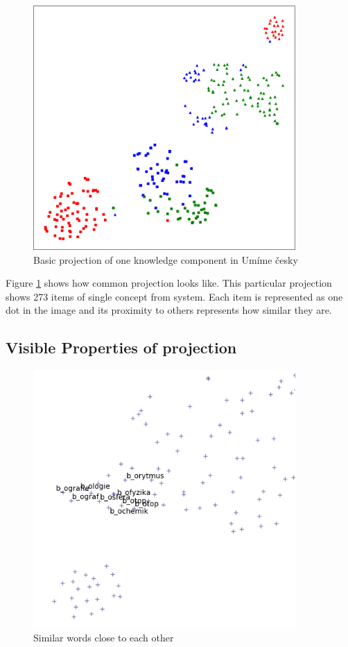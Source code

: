 \documentclass[
  digital, %
  table,   %
  nolof,     %
  nolot,     %
  nocover
]{fithesis3}
\begin{document}
\begin{figure}
  \begin{center}
    \includegraphics[width=10cm]{img/common_projection}
  \end{center}
  \caption{Basic projection of one knowledge component in Umíme česky}
  \label{fig:commonprojection}
\end{figure}

Figure \ref{fig:commonprojection} shows how common projection looks
like. This particular projection shows 273 items of single concept from
system. Each item is represented as one dot in the image and its
proximity to others represents how similar they are.

\subsection{Visible Properties of
projection}\label{visible-properties-of-projection}



\begin{figure}
  \begin{center}
    \includegraphics[width=10cm]{img/similar_words}
  \end{center}
  \caption{Similar words close to each other}
  \label{similarwords}
\end{figure}
\end{document}
